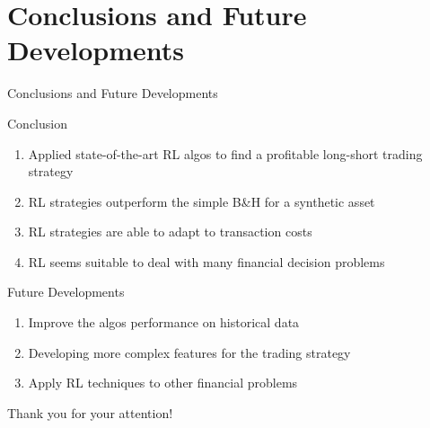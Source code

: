 \section{Conclusions and Future Developments}
\label{sec:conclusions}

\begin{frame}[c]{Conclusions and Future Developments}
	\begin{block}{Conclusion}
		\begin{enumerate}
			\item Applied state-of-the-art RL algos to find a profitable long-short trading strategy
			\item RL strategies outperform the simple B\&H for a synthetic asset
			\item RL strategies are able to adapt to transaction costs
			\item RL seems suitable to deal with many financial decision problems 
			
		\end{enumerate}
	\end{block}
	
	\begin{block}{Future Developments}
		\begin{enumerate}
			\item Improve the algos performance on historical data
			\item Developing more complex features for the trading strategy
			\item Apply RL techniques to other financial problems 
		\end{enumerate}
	\end{block}
\end{frame}

\begin{frame}[c]{}
  \centering \Huge
  Thank you for your attention!
\end{frame}